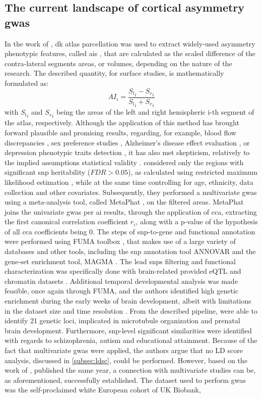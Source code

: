 \subsection{The current landscape of cortical asymmetry \ac{gwas}} 
 In the work of \citet{Sha2021}, \ac{dk} atlas parcellation was used to extract widely-used asymmetry phenotypic features, called \acfp{ai} \cite{Graham2022,Sarica2018,Kong2018,Savic2008,Zuo2019}, that are calculated as the scaled difference of the contra-lateral segments areas, or volumes, depending on the nature of the research. The described quantity, for surface studies, is mathematically formulated as:
$$
AI_i = \frac{{S_l}_i-{S_r}_i}{{S_l}_i+{S_r}_i}
$$
with ${S_l}_i$ and ${S_r}_i$ being the areas of the left and right hemispheric i-th segment of the atlas, respectively. Although the application of this method has brought forward plausible and promising results, regarding, for example, blood flow discrepancies \cite{Graham2022}, sex preference studies \cite{Savic2008}, Alzheimer's disease effect evaluation \cite{Sarica2018},  or depression phenotypic traits detection \cite{Zuo2019}, it has also met skepticism, relatively to the implied assumptions statistical validity \cite{Coles2008}. \citet{Sha2021} considered only the regions with significant \ac{snp} heritability ($FDR>0.05$), as calculated using restricted maximum likelihood estimation \cite{Yang2010}, while at the same time controlling for age, ethnicity, data collection and other covariates. Subsequently, they performed a multivariate \ac{gwas}  using a meta-analysis tool, called MetaPhat \cite{Lin2020}, on the filtered areas. MetaPhat joins the univariate \ac{gwas} per \ac{ai} results, through the application of \ac{cca}, extracting the first canonical correlation coefficient $r_i$, along with a p-value of the hypothesis of all \ac{cca} coefficients being 0. The steps of snp-to-gene and functional annotation were performed using FUMA toolbox \cite{Watanabe2017}, that makes use of a large variety of databases and other tools, including the \ac{snp} annotation tool ANNOVAR \cite{Wang2010} and  the gene-set enrichment tool, MAGMA \cite{DeLeeuw2015}. The lead \acp{snp} filtering and functional characterization was specifically done with brain-related provided eQTL and chromatin datasets \cite{Sha2021}. Additional temporal developmental analysis was made feasible, once again through FUMA, and the authors identified high genetic enrichment during the early weeks of brain development, albeit with limitations in the dataset size and time resolution \cite{Kang2011}.  From the described pipeline, \citet{Sha2021} were able to identify 21 genetic loci, implicated in microtubule organization and prenatal brain development. Furthermore, \ac{snp}-level significant similarities were identified with regards to schizophrenia, autism and educational attainment\cite{Sha2021}. Because of the fact that multivariate \ac{gwas} were applied, the authors argue that no LD score analysis, discussed in \autoref{subsec:ldsc}, could be performed. However, based on the work of \citet{Naqvi2021}, published the same year, a connection with multivariate studies can be, as aforementioned, successfully established. The dataset used to perform \ac{gwas} was the self-proclaimed white European cohort of UK Biobank, 